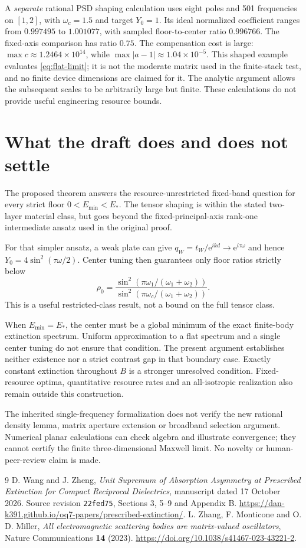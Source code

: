 \documentclass[11pt]{article}
\newcommand{\abs}[1]{\left|#1\right|}
\newcommand{\ee}{\mathrm e}
\begin{document}
A \emph{separate} rational PSD shaping calculation uses eight poles and
501 frequencies on $[1,2]$, with $\omega_c=1.5$ and target $Y_0=1$.
Its ideal normalized coefficient ranges from $0.997495$ to $1.001077$,
with sampled floor-to-center ratio $0.996766$. The fixed-axis comparison has
ratio $0.75$. The compensation cost is large:
$\max c\approx1.2464\times10^{14}$, while
$\max\abs{a-1}\approx1.04\times10^{-5}$.
This shaped example evaluates \eqref{eq:flat-limit}; it is not the moderate
matrix used in the finite-stack test, and no finite device dimensions are
claimed for it. The analytic argument allows the subsequent scales to be
arbitrarily large but finite. These calculations do not provide useful
engineering resource bounds.

\section{What the draft does and does not settle}
The proposed theorem answers the resource-unrestricted fixed-band question
for every strict floor $0<E_{\min}<E_*$. The tensor shaping is within the
stated two-layer material class, but goes beyond the fixed-principal-axis
rank-one intermediate ansatz used in the original proof.

For that simpler ansatz, a weak plate can give
$q_W=t_W/\ee^{ikd}\to\ee^{i\tau\omega}$ and hence
$Y_0=4\sin^2(\tau\omega/2)$. Center tuning then guarantees only floor ratios
strictly below
\[
 \rho_0=
 \frac{\sin^2(\pi\omega_1/(\omega_1+\omega_2))}
      {\sin^2(\pi\omega_c/(\omega_1+\omega_2))}.
\]
This is a useful restricted-class result, not a bound on the full tensor class.

When $E_{\min}=E_*$, the center must be a global minimum of the exact finite-body
extinction spectrum. Uniform approximation to a flat spectrum and a single
center tuning do not ensure that condition. The present argument establishes
neither existence nor a strict contrast gap in that boundary case.
Exactly constant extinction throughout $B$ is a stronger unresolved condition.
Fixed-resource optima, quantitative resource rates and an all-isotropic
realization also remain outside this construction.

The inherited single-frequency formalization does not verify the new rational
density lemma, matrix aperture extension or broadband selection argument.
Numerical planar calculations can check algebra and illustrate convergence;
they cannot certify the finite three-dimensional Maxwell limit.
No novelty or human-peer-review claim is made.

\begin{thebibliography}{9}
D. Wang and J. Zheng,
\emph{Unit Supremum of Absorption Asymmetry at Prescribed Extinction for
Compact Reciprocal Dielectrics}, manuscript dated 17 October 2026.
Source revision \texttt{22fed75}, Sections 3, 5--9 and Appendix B.
\url{https://dan-k391.github.io/oq7-papers/prescribed-extinction/}.
L. Zhang, F. Monticone and O. D. Miller,
\emph{All electromagnetic scattering bodies are matrix-valued oscillators},
Nature Communications \textbf{14} (2023).
\url{https://doi.org/10.1038/s41467-023-43221-2}.
\end{thebibliography}
\end{document}
